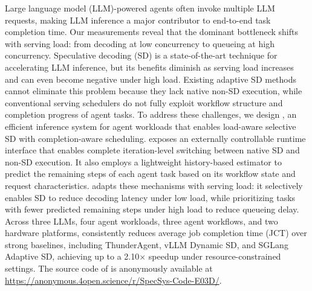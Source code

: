 Large language model (LLM)-powered agents often invoke multiple LLM requests, making LLM inference a major contributor to end-to-end task completion time. 
Our measurements reveal that the dominant bottleneck shifts with serving load: from decoding at low concurrency to queueing at high concurrency.
%
% 
% 
%
% 
% 
Speculative decoding (SD) is a state-of-the-art technique for accelerating LLM inference, but its benefits diminish as serving load increases and can even become negative under high load. Existing adaptive SD methods cannot eliminate this problem because they lack native non-SD execution, while conventional serving schedulers do not fully exploit workflow structure and completion progress of agent tasks.
To address these challenges, we design \sysname, an efficient inference system for agent workloads that enables load-aware selective SD with completion-aware scheduling. 
\sysname exposes an externally controllable runtime interface that enables complete iteration-level switching between native SD and non-SD execution.
It also employs a lightweight history-based estimator to predict the remaining steps of each agent task based on its workflow state and request characteristics. %
\sysname adapts these mechanisms with serving load: it selectively enables SD to reduce decoding latency under low load, while prioritizing tasks with fewer predicted remaining steps under high load to reduce queueing delay. 
Across three LLMs, four agent workloads, three agent workflows, and two hardware platforms, \sysname consistently reduces average job completion time (JCT) over strong baselines, including ThunderAgent, vLLM Dynamic SD, and SGLang Adaptive SD, achieving up to a 2.10$\times$ speedup under resource-constrained settings.
The source code of \sysname is anonymously available at
\url{https://anonymous.4open.science/r/SpecSys-Code-E03D/}.